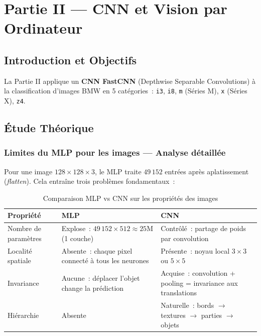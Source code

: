\documentclass[12pt,a4paper]{report}
\begin{document}
\chapter{Partie II --- CNN et Vision par Ordinateur}

\section{Introduction et Objectifs}

La Partie II applique un \textbf{CNN FastCNN} (Depthwise Separable Convolutions) à la 
classification d'images BMW en 5 catégories~: \texttt{i3}, \texttt{i8}, \texttt{m} 
(Séries M), \texttt{x} (Séries X), \texttt{z4}.

\section{Étude Théorique}

\subsection{Limites du MLP pour les images --- Analyse détaillée}

Pour une image $128\times128\times3$, le MLP traite $49\,152$ entrées après aplatissement
(\textit{flatten}). Cela entraîne trois problèmes fondamentaux~:

\begin{table}[H]
\centering
\caption{Comparaison MLP vs CNN sur les propriétés des images}
\begin{tabularx}{\textwidth}{lXX}
\toprule
\textbf{Propriété} & \textbf{MLP} & \textbf{CNN} \\
\midrule
Nombre de paramètres & Explose~: $49\,152 \times 512 \approx 25$M (1 couche) & Contrôlé~: partage de poids par convolution \\
Localité spatiale & Absente~: chaque pixel connecté à tous les neurones & Présente~: noyau local $3\times3$ ou $5\times5$ \\
Invariance & Aucune~: déplacer l'objet change la prédiction & Acquise~: convolution + pooling = invariance aux translations \\
Hiérarchie & Absente & Naturelle~: bords $\to$ textures $\to$ parties $\to$ objets \\
\bottomrule
\end{tabularx}
\end{table}
\end{document}
